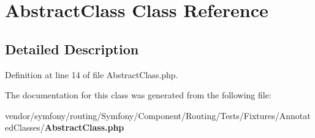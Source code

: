 \section{Abstract\+Class Class Reference}
\label{class_symfony_1_1_component_1_1_routing_1_1_tests_1_1_fixtures_1_1_annotated_classes_1_1_abstract_class}


\subsection{Detailed Description}


Definition at line 14 of file Abstract\+Class.\+php.



The documentation for this class was generated from the following file\+:\begin{DoxyCompactItemize}
\item 
vendor/symfony/routing/\+Symfony/\+Component/\+Routing/\+Tests/\+Fixtures/\+Annotated\+Classes/{\bf Abstract\+Class.\+php}\end{DoxyCompactItemize}
